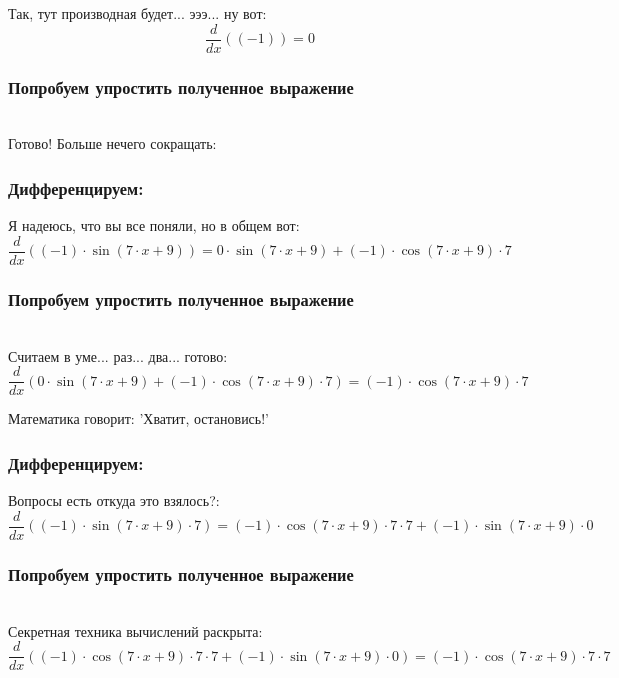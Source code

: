 \documentclass[a4paper,12pt]{article}
\begin{document}
Так, тут производная будет... эээ... ну вот:
\begin{dmath}\frac{d}{dx}\left((-1)\right)=0\end{dmath}
\subsubsection*{Попробуем упростить полученное выражение}
\\Готово! Больше нечего сокращать:

\subsubsection*{Дифференцируем:}

Я надеюсь, что вы все поняли, но в общем вот:
\begin{dmath}\frac{d}{dx}\left((-1)\cdot \operatorname{sin}\left(7\cdot x+ 9\right) \right)=0\cdot \operatorname{sin}\left(7\cdot x+ 9\right) + (-1)\cdot \operatorname{cos}\left(7\cdot x+ 9\right) \cdot 7\end{dmath}
\subsubsection*{Попробуем упростить полученное выражение}
\\Считаем в уме... раз... два... готово:\\
\begin{dmath}
	\frac{d}{dx}\left(0\cdot \operatorname{sin}\left(7\cdot x+ 9\right) + (-1)\cdot \operatorname{cos}\left(7\cdot x+ 9\right) \cdot 7\right) = (-1)\cdot \operatorname{cos}\left(7\cdot x+ 9\right) \cdot 7\end{dmath}

Математика говорит: 'Хватит, остановись!'

\subsubsection*{Дифференцируем:}

Вопросы есть откуда это взялось?:
\begin{dmath}\frac{d}{dx}\left((-1)\cdot \operatorname{sin}\left(7\cdot x+ 9\right) \cdot 7\right)=(-1)\cdot \operatorname{cos}\left(7\cdot x+ 9\right) \cdot 7\cdot 7+ (-1)\cdot \operatorname{sin}\left(7\cdot x+ 9\right) \cdot 0\end{dmath}
\subsubsection*{Попробуем упростить полученное выражение}
\\Секретная техника вычислений раскрыта:\\
\begin{dmath}
	\frac{d}{dx}\left((-1)\cdot \operatorname{cos}\left(7\cdot x+ 9\right) \cdot 7\cdot 7+ (-1)\cdot \operatorname{sin}\left(7\cdot x+ 9\right) \cdot 0\right) = (-1)\cdot \operatorname{cos}\left(7\cdot x+ 9\right) \cdot 7\cdot 7\end{dmath}
\end{document}
